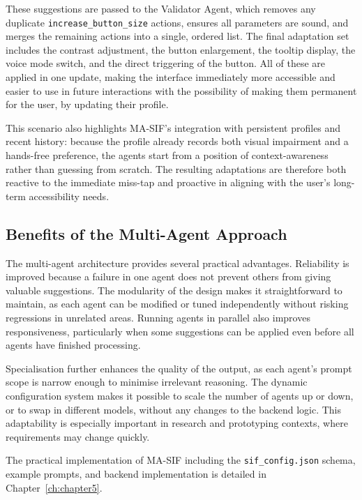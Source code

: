 \documentclass[openany]{book}
\begin{document}
These suggestions are passed to the Validator Agent, which removes any duplicate \texttt{increase\_button\_size} actions, ensures all parameters are sound, and merges the remaining actions into a single, ordered list. The final adaptation set includes the contrast adjustment, the button enlargement, the tooltip display, the voice mode switch, and the direct triggering of the button. All of these are applied in one update, making the interface immediately more accessible and easier to use in future interactions with the possibility of making them permanent for the user, by updating their profile.

This scenario also highlights MA-SIF’s integration with persistent profiles and recent history: because the profile already records both visual impairment and a hands-free preference, the agents start from a position of context-awareness rather than guessing from scratch. The resulting adaptations are therefore both reactive to the immediate miss-tap and proactive in aligning with the user’s long-term accessibility needs.

\subsection{Benefits of the Multi-Agent Approach}
The multi-agent architecture provides several practical advantages. Reliability is improved because a failure in one agent does not prevent others from giving valuable suggestions. The modularity of the design makes it straightforward to maintain, as each agent can be modified or tuned independently without risking regressions in unrelated areas. Running agents in parallel also improves responsiveness, particularly when some suggestions can be applied even before all agents have finished processing.

Specialisation further enhances the quality of the output, as each agent’s prompt scope is narrow enough to minimise irrelevant reasoning. The dynamic configuration system makes it possible to scale the number of agents up or down, or to swap in different models, without any changes to the backend logic. This adaptability is especially important in research and prototyping contexts, where requirements may change quickly.

The practical implementation of MA-SIF including the \texttt{sif\_config.json} schema, example prompts, and backend implementation is detailed in Chapter~\ref{ch:chapter5}.
\end{document}
